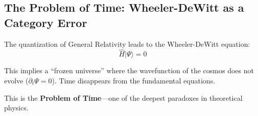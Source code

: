 \subsection{The Problem of Time: Wheeler-DeWitt as a Category Error}
\label{subsec:wheeler_dewitt}

The quantization of General Relativity leads to the Wheeler-DeWitt equation:
\begin{equation}
\hat{H}|\Psi\rangle = 0
\end{equation}

This implies a ``frozen universe'' where the wavefunction of the cosmos does not evolve ($\partial_t \Psi = 0$). Time disappears from the fundamental equations.

This is the \textbf{Problem of Time}---one of the deepest paradoxes in theoretical physics.

